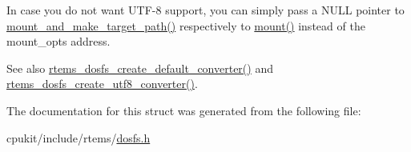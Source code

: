 In case you do not want U\+T\+F-\/8 support, you can simply pass a N\+U\+LL pointer to \mbox{\hyperlink{group__FileSystemTypesAndMount_ga27af6440b4ef795576c94e870c5d997f}{mount\+\_\+and\+\_\+make\+\_\+target\+\_\+path()}} respectively to \mbox{\hyperlink{group__FileSystemTypesAndMount_gaf3c1bed49bb0f3dec88d330b4f88d48b}{mount()}} instead of the mount\+\_\+opts address.

\begin{DoxySeeAlso}{See also}
\mbox{\hyperlink{group__DOSFS_ga9dc28ad698d4946c7bf691fa0b0a6c78}{rtems\+\_\+dosfs\+\_\+create\+\_\+default\+\_\+converter()}} and \mbox{\hyperlink{group__DOSFS_ga47cec61b81f7868a5b821709246a8509}{rtems\+\_\+dosfs\+\_\+create\+\_\+utf8\+\_\+converter()}}. 
\end{DoxySeeAlso}


The documentation for this struct was generated from the following file\+:\begin{DoxyCompactItemize}
\item 
cpukit/include/rtems/\mbox{\hyperlink{dosfs_8h}{dosfs.\+h}}\end{DoxyCompactItemize}
